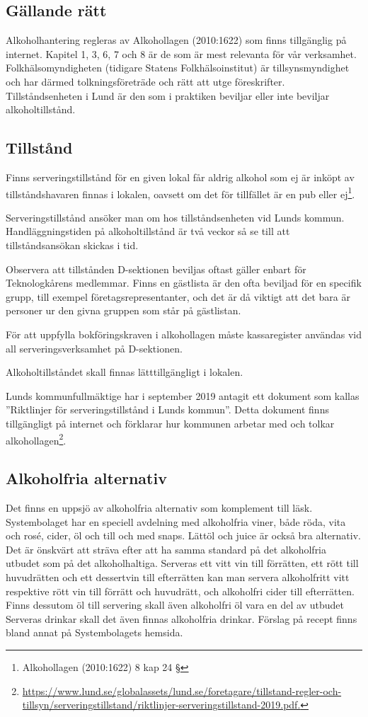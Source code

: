 \documentclass[]{dsekprotokoll}
\begin{document}
\subsection{Gällande rätt}
Alkoholhantering regleras av Alkohollagen (2010:1622) som finns tillgänglig på internet.
Kapitel 1, 3, 6, 7 och 8 är de som är mest relevanta för vår verksamhet. Folkhälsomyndigheten (tidigare Statens Folkhälsoinstitut) är tillsynsmyndighet och har därmed tolkningsföreträde och rätt att utge föreskrifter. Tillståndsenheten i Lund är den som i praktiken beviljar eller inte beviljar alkoholtillstånd.

\subsection{Tillstånd}
Finns serveringstillstånd för en given lokal får aldrig alkohol som ej är inköpt av tillståndshavaren finnas i lokalen, oavsett om det för tillfället är en pub eller ej\footnote{Alkohollagen (2010:1622) 8 kap 24 §}.

Serveringstillstånd ansöker man om hos tillståndsenheten vid Lunds kommun. Handläggningstiden på alkoholtillstånd är två veckor så se till att tillståndsansökan skickas i tid.

Observera att tillstånden D-sektionen beviljas oftast gäller enbart för Teknologkårens medlemmar. Finns en gästlista är den ofta beviljad för en specifik grupp, till exempel företagsrepresentanter, och det är då viktigt att det bara är personer ur den givna gruppen som står på gästlistan.

För att uppfylla bokföringskraven i alkohollagen måste kassaregister användas vid all
serveringsverksamhet på D-sektionen.

Alkoholtillståndet skall finnas lätttillgängligt i lokalen.

Lunds kommunfullmäktige har i september 2019 antagit ett dokument som kallas ''Riktlinjer för serveringstillstånd i Lunds kommun''. Detta dokument finns tillgängligt på internet och förklarar hur kommunen arbetar med och tolkar alkohollagen\footnote{\url{https://www.lund.se/globalassets/lund.se/foretagare/tillstand-regler-och-
        tillsyn/serveringstillstand/riktlinjer-serveringstillstand-2019.pdf.}
}.

\subsection{Alkoholfria alternativ}
Det finns en uppsjö av alkoholfria alternativ som komplement till läsk. Systembolaget har en speciell avdelning med alkoholfria viner, både röda, vita och rosé, cider, öl och till och med snaps. Lättöl och juice är också bra alternativ. Det är önskvärt att sträva efter att ha samma standard på det alkoholfria utbudet som på det alkoholhaltiga. Serveras ett vitt vin till förrätten, ett rött till huvudrätten och ett dessertvin till efterrätten kan man servera alkoholfritt vitt respektive rött vin till förrätt och huvudrätt, och alkoholfri cider till efterrätten. Finns dessutom öl till servering skall även alkoholfri öl vara en del av utbudet
Serveras drinkar skall det även finnas alkoholfria drinkar. Förslag på recept finns bland annat
på Systembolagets hemsida.
\end{document}
